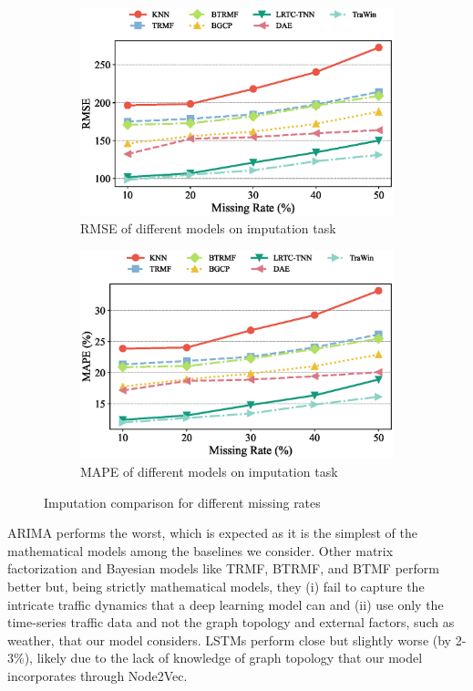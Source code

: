 \begin{figure}[]
  \centering
  \begin{subfigure}{0.5\textwidth}
    \includegraphics[width=\linewidth]{rmse_imput.eps}
    \caption{RMSE of different models on imputation task}
    \label{fig:mape_imput}
  \end{subfigure}%
  \begin{subfigure}{0.5\textwidth}
    \includegraphics[width=\linewidth]{mape_imput.eps}
    \caption{MAPE of different models on imputation task}
    \label{fig:rmse_imput}
  \end{subfigure}
  \caption{Imputation comparison for different missing rates}
  \label{fig:imput}
  \end{figure}

ARIMA performs the worst, which is expected as it is the simplest of the mathematical models among the baselines we consider. Other matrix factorization and Bayesian models like TRMF, BTRMF, and BTMF perform better but, being strictly mathematical models, they (i) fail to capture the intricate traffic dynamics that a deep learning model can and (ii) use only the time-series traffic data and not the graph topology and external factors, such as weather, that our model considers. LSTMs perform close but slightly worse (by 2-3\%), likely due to the lack of knowledge of graph topology that our model incorporates through Node2Vec.

